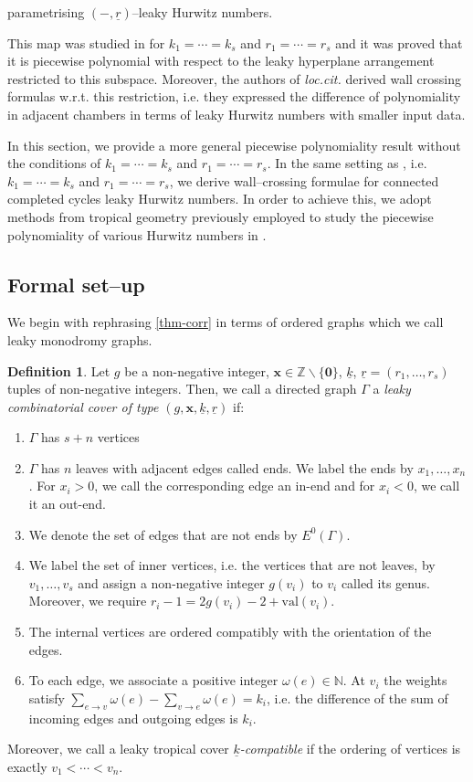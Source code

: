 \documentclass[10pt,a4paper,oneside,no-math,reqno]{amsart}%
\theoremstyle{plain}
\theoremstyle{definition}
\newtheorem{definition}[theorem]{Definition}
\theoremstyle{remark}
\numberwithin{equation}{section}
\newcommand{\1}{\mathds{1}}
\newcommand{\<}{\langle}
\renewcommand{\>}{\rangle}
\begin{document}
parametrising $(-,\underline{r})$--leaky Hurwitz numbers.

This map was studied in \cite{AKL25} for $k_1=\cdots=k_s$ and $r_1=\cdots=r_s$ and it was proved that it is piecewise polynomial with respect to the leaky hyperplane arrangement restricted to this subspace. Moreover, the authors of \emph{loc.cit.} derived wall crossing formulas w.r.t. this restriction, i.e. they expressed the difference of polynomiality in adjacent chambers in terms of leaky Hurwitz numbers with smaller input data. 

In this section, we provide a more general piecewise polynomiality result without the conditions of $k_1=\cdots=k_s$ and $r_1=\cdots=r_s$. In the same setting as \cite{AKL25}, i.e. $k_1=\cdots=k_s$ and $r_1=\cdots=r_s$, we derive wall--crossing formulae for connected completed cycles leaky Hurwitz numbers.
In order to achieve this, we adopt methods from tropical geometry previously employed to study the piecewise polynomiality of various Hurwitz numbers in \cite{CJM11,HL20}.

\subsection{Formal set--up}
We begin with rephrasing \cref{thm-corr} in terms of ordered graphs which we call leaky monodromy graphs.

\begin{definition}
    Let $g$ be a non-negative integer, $\textbf{x}\in\mathbb{Z}\backslash\{\textbf{0}\}$, $\underline{k}$, $\underline{r}=(r_1,\dots,r_s)$ tuples of non-negative integers. Then, we call a directed graph $\Gamma$ a \emph{leaky combinatorial cover of type $(g,\textbf{x},\underline{k},\underline{r})$} if:
    \begin{enumerate}
        \item $\Gamma$ has $s+n$ vertices
        \item $\Gamma$ has $n$ leaves with adjacent edges called ends. We label the ends by $x_1,\dots,x_n$. For $x_i>0$, we call the corresponding edge an in-end and for $x_i<0$, we call it an out-end.
        \item We denote the set of edges that are not ends by $E^0(\Gamma)$.
        \item We label the set of inner vertices, i.e. the vertices that are not leaves, by $v_1,\dots,v_s$ and assign a non-negative integer $g(v_i)$ to $v_i$ called its genus. Moreover, we require $r_i-1=2g(v_i)-2+\mathrm{val}(v_i)$.
        \item The internal vertices are ordered compatibly with the orientation of the edges.
        \item To each edge, we associate a positive integer $\omega(e)\in\mathbb{N}$. At $v_i$ the weights satisfy $\sum_{e\to v} \omega(e)-\sum_{v\to e}\omega(e)=k_i$, i.e. the difference of the sum of incoming edges and outgoing edges is $k_i$.
    \end{enumerate}
    Moreover, we call a leaky tropical cover \emph{$\underline{k}$-compatible} if the ordering of vertices is exactly $v_1<\cdots<v_n$.
\end{definition}
\end{document}
